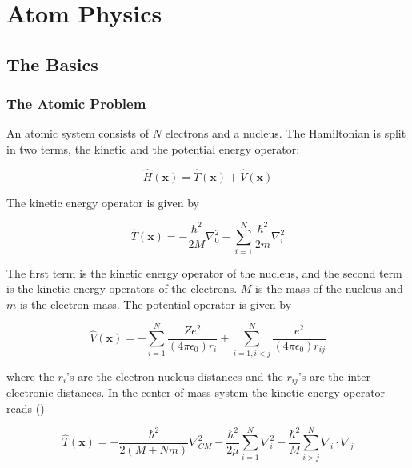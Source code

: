 \chapter{Atom Physics}

\section{The Basics}

\subsection{The Atomic Problem}
\label{TheAtomicProblem}

An atomic system consists of $N$ electrons and a nucleus. 
The Hamiltonian is split in two terms, the kinetic and the potential
energy operator:

\begin{equation}
  \hat{H}(\mathbf{x}) 
  = \hat{T}(\mathbf{x}) 
  + \hat{V}(\mathbf{x})
\end{equation}

The kinetic energy operator is given by

\begin{equation}
  \hat{T}(\mathbf{x}) = -\frac{\hbar^2}{2M}\nabla^2_0
  -\sum_{i=1}^{N}\frac{\hbar^2}{2m}\nabla^2_i
\end{equation}

The first term is the kinetic energy operator of the nucleus,
and the second term is the kinetic energy operators of the electrons.
$M$ is the mass of the nucleus and $m$ is the electron mass. The
potential operator is given by

\begin{equation}
  \hat{V}(\mathbf{x}) = 
  - \sum_{i=1}^{N} \frac{Ze^2}{(4\pi \epsilon_0)r_i}
  + \sum_{i=1,i<j}^{N} \frac{e^2}{(4\pi \epsilon_0)r_{ij}}
\end{equation}

where the $r_i$'s are the electron-nucleus distances and the
$r_{ij}$'s are the inter-electronic distances. In the center of mass
system the kinetic energy operator reads (\cite{bransden1983})

\begin{equation}
  \hat{T}(\mathbf{x}) = -\frac{\hbar^2}{2(M+Nm)}\nabla^2_{CM}
  -\frac{\hbar^2}{2\mu}\sum_{i=1}^{N}\nabla^2_i
  -\frac{\hbar^2}{M}\sum_{i>j}^{N}\nabla_i\cdot\nabla_j
  \label{centerOfMassKineticEnergyOperator}
\end{equation}

